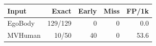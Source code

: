 \begin{tabular}{lrrrr}
\toprule
Input & Exact & Early & Miss & FP/1k \\
\midrule
EgoBody & 129/129 & 0 & 0 & 0.0 \\
MVHuman & 10/50 & 40 & 0 & 53.6 \\
\bottomrule
\end{tabular}

